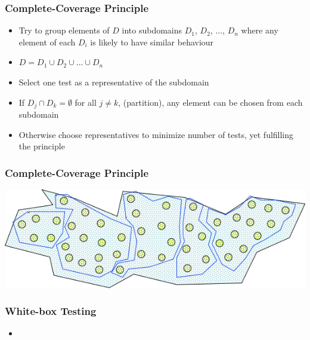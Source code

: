 \documentclass[t,12pt,numbers,fleqn]{beamer}
\begin{document}

\begin{frame}
\frametitle{Complete-Coverage Principle}

\begin{itemize}
\item Try to group elements of $D$ into subdomains $D_1$, $D_2$, ..., $D_n$
  where any element of each $D_i$ is likely to have similar behaviour
\item $D = D_1 \cup D_2 \cup ... \cup D_n$
\item Select one test as a representative of the subdomain
\item If $D_j \cap D_k = \emptyset$ for all $j \neq k$, (partition), any element
  can be chosen from each subdomain
\item Otherwise choose representatives to minimize number of tests, yet
  fulfilling the principle
\end{itemize}

\end{frame}


\begin{frame}
\frametitle{Complete-Coverage Principle}

\includegraphics[scale=0.5]{../Figures/CompleteCoveragePrinciple.png}

\end{frame}


\begin{frame}
\frametitle{White-box Testing}

\begin{itemize}
\item {}
\end{itemize}

\end{frame}
\end{document}
